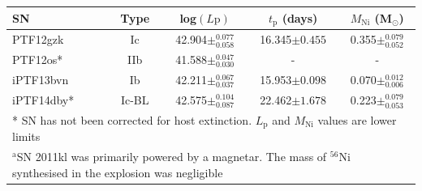 \documentclass[a4paper,fleqn,usenatbib]{mnras}
\begin{document}
\begin{table}
\renewcommand{\arraystretch}{1.5}
 \centering
 \begin{minipage}{110mm}
 \begin{tabular}{lcccc}
  \hline
 SN & Type & log$(L{\mathrm{p}})$  & $t_{\mathrm{p}}$ (days) & $M_{\mathrm{Ni}}$ (M$_{\odot}$)   \\
  \hline
PTF12gzk & Ic & 42.904$\pm^{0.077}_{0.058}$ &16.345$\pm{0.455}$ &0.355$\pm^{0.079}_{0.052}$ \\
PTF12os* & IIb & 41.588$\pm^{0.047}_{0.030}$ &- &- \\
iPTF13bvn & Ib & 42.211$\pm^{0.067}_{0.037}$ &15.953$\pm{0.098}$ &0.070$\pm^{0.012}_{0.006}$ \\
iPTF14dby* & Ic-BL & 42.575$\pm^{0.104}_{0.087}$ &22.462$\pm{1.678}$ &0.223$\pm^{0.079}_{0.053}$ \\
 \hline
 \multicolumn{5}{p{\textwidth}}{* SN has not been corrected for host extinction. $L_{\mathrm{p}}$ and $M_{\mathrm{Ni}}$ values are lower limits}\\
 \multicolumn{5}{p{\textwidth}}{$^{\mathrm{a}}$SN 2011kl was primarily powered by a magnetar. The mass of $^{56}$Ni synthesised in the explosion was negligible \citep{Greiner2015}}
\end{tabular}
\end{minipage}
\end{table}
\end{document}
